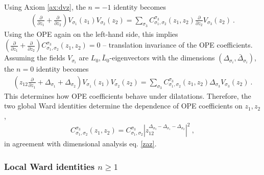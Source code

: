 \documentclass[12pt, a4paper, notitlepage, twoside]{report}
\numberwithin{equation}{section}
\theoremstyle{break}
\begin{document}
Using Axiom \ref{ax:dvz}, the $n=-1$ identity becomes 
 \begin{align}
  \left(\frac{\partial}{\partial z_1} +\frac{\partial}{\partial z_2}\right) V_{\sigma_1}(z_1)V_{\sigma_2}(z_2) = \sum_{\sigma_3} C_{\sigma_1,\sigma_2}^{\sigma_3}(z_1,z_2) \frac{\partial}{\partial z_2} V_{\sigma_3}(z_2)\ .
 \end{align}
Using the OPE again on the left-hand side, this implies $\left(\frac{\partial}{\partial z_1} +\frac{\partial}{\partial z_2}\right) C_{\sigma_1,\sigma_2}^{\sigma_3}(z_1,z_2)=0$ -- translation invariance of the OPE coefficients. 
Assuming the fields $V_{\sigma_i}$ are  $L_0,\bar L_0$-eigenvectors with the dimensions $(\Delta_{\sigma_i}, \bar\Delta_{\sigma_i})$, the $n=0$ identity becomes 
\begin{align}
 \left(z_{12}\frac{\partial}{\partial z_1} + \Delta_{\sigma_1}+\Delta_{\sigma_2}\right) V_{\sigma_1}(z_1)V_{\sigma_2}(z_2) = \sum_{\sigma_3} C_{\sigma_1,\sigma_2}^{\sigma_3}(z_1,z_2) \Delta_{\sigma_3} V_{\sigma_3}(z_2)\ .
\end{align}
This determines how OPE coefficients behave under dilatations. 
Therefore, the two global Ward identities determine the dependence of OPE coefficients on $z_1,z_2$,
\begin{align}
 C_{\sigma_1,\sigma_2}^{\sigma_3}(z_1,z_2) = C_{\sigma_1,\sigma_2}^{\sigma_3} 
 \left| z_{12}^{\Delta_{{\sigma_3}}-\Delta_{\sigma_1}-\Delta_{\sigma_2}} \right|^2 
 \ ,
 \label{eq:coz}
\end{align}
in agreement with dimensional analysis eq. \eqref{zaz}.

\subsubsection{Local Ward identities $n\geq 1$}
\end{document}
